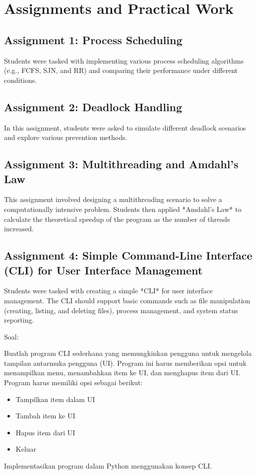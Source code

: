 \documentclass[12pt]{article}
\begin{document}
	\section{Assignments and Practical Work}
	\subsection{Assignment 1: Process Scheduling}
	Students were tasked with implementing various process scheduling algorithms (e.g., FCFS, SJN, and RR) and comparing their performance under different conditions.
	
	\subsection{Assignment 2: Deadlock Handling}
	In this assignment, students were asked to simulate different deadlock scenarios and explore various prevention methods.
	
	\subsection{Assignment 3: Multithreading and Amdahl's Law}
	This assignment involved designing a multithreading scenario to solve a computationally intensive problem. Students then applied *Amdahl's Law* to calculate the theoretical speedup of the program as the number of threads increased.
	
	\subsection{Assignment 4: Simple Command-Line Interface (CLI) for User Interface Management}
	Students were tasked with creating a simple *CLI* for user interface management. The CLI should support basic commands such as file manipulation (creating, listing, and deleting files), process management, and system status reporting.
	
	Soal:
	\par Buatlah program CLI sederhana yang memungkinkan pengguna untuk mengelola tampilan antarmuka pengguna (UI). Program ini harus memberikan opsi untuk menampilkan menu, menambahkan item ke UI, dan menghapus item dari UI.
	Program harus memiliki opsi sebagai berikut:
	\begin{itemize}
		
		\item Tampilkan item dalam UI
		\item Tambah item ke UI
		\item Hapus item dari UI
		\item Keluar
	\end{itemize}
	\par Implementasikan program dalam Python menggunakan konsep CLI.
	
\end{document}
